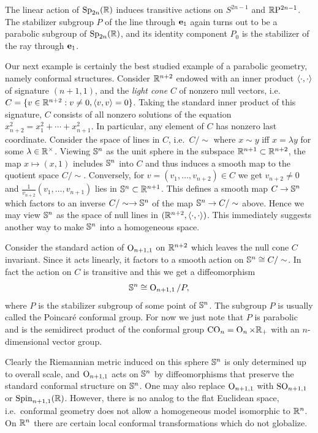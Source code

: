 \begin{defn}
    The linear action of $\Sp_{2n}(\bbR)$ induces transitive actions on $S^{2n-1}$ and $\RP^{2n-1}$. The stabilizer subgroup $P$ of the line through $\bf{e}_1$ again turns out to be a parabolic subgroup of $\Sp_{2n}(\bbR)$, and its identity component $P_0$ is the stabilizer of the ray through $\bf{e}_1$.
\end{defn}


Our next example is certainly the best studied example of a parabolic geometry, namely conformal structures. Consider $\bbR^{n+2}$ endowed with an inner product $\<\cdot,\cdot\>$ of signature $(n+1,1)$, and the \emph{light cone} $C$ of nonzero null vectors, i.e.\ $C=\{v\in\bbR^{n+2}:v\neq 0,\<v,v\>=0\}$. Taking the standard inner product of this signature, $C$ consists of all nonzero solutions of the equation $x_{n+2}^2=x_1^2+\cdots +x_{n+1}^2$. In particular, any element of $C$ has nonzero last coordinate. Consider the space of lines in $C$, i.e.\ $C\slash \sim$ where $x\sim y$ iff $x=\lambda y$ for some $\lambda \in \bbR^\times$. Viewing $\bbS^n$ as the unit sphere in the subspace $\bbR^{n+1}\subset \bbR^{n+2}$, the map $x\mapsto (x,1)$ includes $\bbS^n$ into $C$ and thus induces a smooth map to the quotient space $C\slash \sim$. Conversely, for $v=(v_1,\ldots,v_{n+2})\in C$ we get $v_{n+2}\neq 0$ and $\frac{1}{v_{n+2}}(v_1,\ldots,v_{n+1})$ lies in $\bbS^n\subset \bbR^{n+1}$. This defines a smooth map $C\to \bbS^n$ which factors to an inverse $C\slash \sim\to \bbS^n$ of the map $\bbS^n\to C\slash \sim$ above. Hence we may view $\bbS^n$ as the space of null lines in $(\bbR^{n+2},\<\cdot,\cdot\>)$. This immediately suggests another way to make $\bbS^n$ into a homogeneous space.

\begin{defn}
    Consider the standard action of $\Or_{n+1,1}$ on $\bbR^{n+2}$ which leaves the null cone $C$ invariant. Since it acts linearly, it factors to a smooth action on $\bbS^n\cong C\slash \sim$. In fact the action on $C$ is transitive and this we get a diffeomorphism
    \[\bbS^n\cong \Or_{n+1,1}\slash P,\]
    where $P$ is the stabilizer subgroup of some point of $\bbS^n$. The subgroup $P$ is usually called the Poincar\'e conformal group. For now we just note that $P$ is parabolic and is the semidirect product of the conformal group $\CO_n=\Or_n\times\bbR_+$ with an $n$-dimensional vector group.
\end{defn}

Clearly the Riemannian metric induced on this sphere $\bbS^n$ is only determined up to overall scale, and $\Or_{n+1,1}$ acts on $\bbS^n$ by diffeomorphisms that preserve the standard conformal structure on $\bbS^n$. One may also replace $\Or_{n+1,1}$ with $\SO_{n+1,1}$ or $\Spin_{n+1,1}(\bbR)$. However, there is no analog to the flat Euclidean space, i.e.\ conformal geometry does not allow a homogeneous model isomorphic to $\bbR^n$. On $\bbR^n$ there are certain local conformal transformations which do not globalize.

